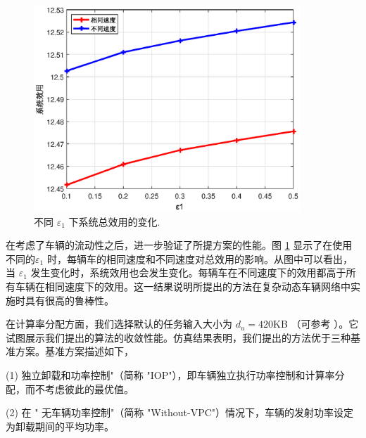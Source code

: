 \begin{figure}[H]
\centering
\includegraphics[width=10cm]{figures//chap3//diff_e1.eps}
\caption{不同 $\varepsilon_1$ 下系统总效用的变化.}
\label{F6}
\end{figure}

在考虑了车辆的流动性之后，进一步验证了所提方案的性能。图 \ref{F6} 显示了在使用不同的$\varepsilon_1$ 时，每辆车的相同速度和不同速度对总效用的影响。从图中可以看出，当 $\varepsilon_1$ 发生变化时，系统效用也会发生变化。每辆车在不同速度下的效用都高于所有车辆在相同速度下的效用。这一结果说明所提出的方法在复杂动态车辆网络中实施时具有很高的鲁棒性。

在计算率分配方面，我们选择默认的任务输入大小为 $d_u=420$KB （可参考 \cite{Xu2015}）。它试图展示我们提出的算法的收敛性能。仿真结果表明，我们提出的方法优于三种基准方案。基准方案描述如下，

(1) 独立卸载和功率控制"（简称 "IOP"），即车辆独立执行功率控制和计算率分配，而不考虑彼此的最优值。

(2) 在 " 无车辆功率控制"（简称 "Without-VPC"）情况下，车辆的发射功率设定为卸载期间的平均功率。

